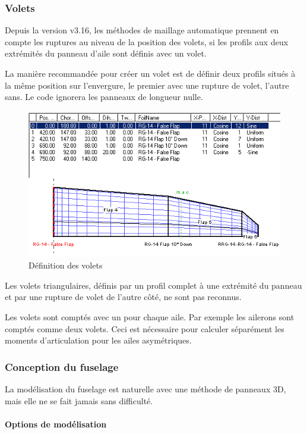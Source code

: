 \documentclass[a4paper,twoside,12pt,dvips]{article}
\begin{document}
\subsubsection{Volets}

Depuis la version v3.16, les méthodes de maillage automatique prennent en 
compte les ruptures au niveau de la position des volets, si les profils
aux deux extrémités du panneau d’aile sont définis avec un volet. 

La manière recommandée pour créer un volet est de définir deux profils 
situés à la même position sur l’envergure, le premier avec une rupture de
volet, l’autre sans. Le code ignorera les panneaux de longueur nulle. 

\begin{figure}[htbp]
	\centering
	\includegraphics[width=0.8\linewidth]{img-08}
	\caption{Définition des volets}
	\label{img:définition_volets}
\end{figure}

Les volets triangulaires, définis par un profil complet à une extrémité du panneau et par une rupture de volet de l’autre côté, ne sont pas reconnus.

Les volets sont comptés avec un pour chaque aile. Par exemple les ailerons sont comptés comme deux volets. Ceci est nécessaire pour calculer séparément les moments d’articulation pour les ailes asymétriques.

\subsubsection{Conception du fuselage}

La modélisation du fuselage est naturelle avec une méthode de panneaux 3D, mais elle ne se fait jamais sans difficulté.

\paragraph{Options de modélisation}
\end{document}
